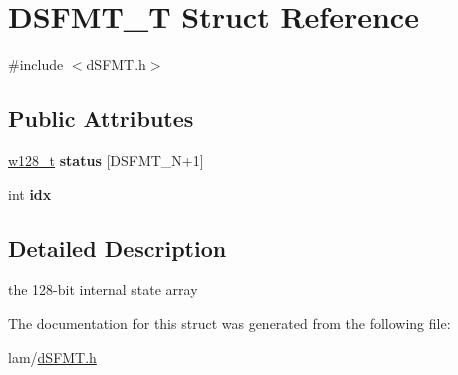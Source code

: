 \hypertarget{structDSFMT__T}{
\section{DSFMT\_\-T Struct Reference}
\label{structDSFMT__T}
}


{\ttfamily \#include $<$dSFMT.h$>$}\subsection*{Public Attributes}
\begin{DoxyCompactItemize}
\item 
\hypertarget{structDSFMT__T_aa7b5e6f3e8e109b75493514525854931}{
\hyperlink{unionW128__T}{w128\_\-t} {\bfseries status} \mbox{[}DSFMT\_\-N+1\mbox{]}}
\label{structDSFMT__T_aa7b5e6f3e8e109b75493514525854931}

\item 
\hypertarget{structDSFMT__T_a776de3ff937f19d246e7edce2676981a}{
int {\bfseries idx}}
\label{structDSFMT__T_a776de3ff937f19d246e7edce2676981a}

\end{DoxyCompactItemize}


\subsection{Detailed Description}
the 128-\/bit internal state array 

The documentation for this struct was generated from the following file:\begin{DoxyCompactItemize}
\item 
lam/\hyperlink{dSFMT_8h}{dSFMT.h}\end{DoxyCompactItemize}
